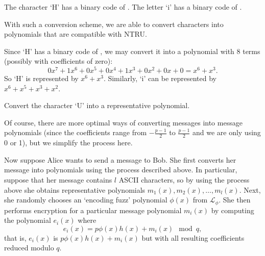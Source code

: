\begin{example}
    The character `H' has a binary code of . The letter `i' has a binary code of .
\end{example}

With such a conversion scheme, we are able to convert characters into polynomials that are compatible with NTRU.

\begin{example}
    Since `H' has a binary code of , we may convert it into a polynomial with 8 terms (possibly with coefficients of zero):
    \[
        0x^7 + 1x^6 + 0x^5 + 0x^4 + 1x^3 + 0x^2 + 0x + 0 = x^6 + x^3.
    \]
    So `H' is represented by $x^6 + x^3$. Similarly, `i' can be represented by $x^6 + x^5 + x^3 + x^2$.
\end{example}

\begin{exercise}
    Convert the character `U' into a representative polynomial.
\end{exercise}

Of course, there are more optimal ways of converting messages into message polynomials (since the coefficients range from $-\frac{p-1}2$ to $\frac{p-1}2$ and we are only using 0 or 1), but we simplify the process here.

Now suppose Alice wants to send a message to Bob. She first converts her message into polynomials using the process described above. In particular, suppose that her message contains $l$ ASCII characters, so by using the process above she obtains representative polynomials $m_1(x), m_2(x), \dots, m_l(x)$. Next, she randomly chooses an `encoding fuzz' polynomial $\phi(x)$ from $\mathcal{L}_\phi$. She then performs encryption for a particular message polynomial $m_i(x)$ by computing the polynomial $e_i(x)$ where
\[
    e_i(x) = p\phi(x)h(x) + m_i(x) \mod q,
\]
that is, $e_i(x)$ is $p\phi(x)h(x) + m_i(x)$ but with all resulting coefficients reduced modulo $q$.

